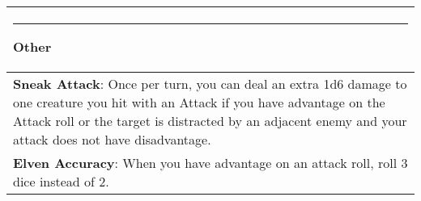 \documentclass[twocolumn]{article}
\begin{document}

\\
\noindent\begin{tabular}{|m{3.1in}|}
\hline
\rule{1.3in}{0pt}Other\\
\hline
\textbf{Sneak Attack}: Once per turn, you can deal an extra 1d6 damage to one creature you hit with an Attack if you have advantage on the Attack roll or the target is distracted by an adjacent enemy and your attack does not have disadvantage. \\
\hline
\textbf{Elven Accuracy}: When you have advantage on an attack roll, roll 3 dice instead of 2. \\
\hline
\end{tabular}
\end{document}
